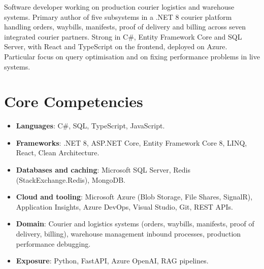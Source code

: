\documentclass[11pt,a4paper,sans]{moderncv}
\begin{document}
\makecvtitle


\vspace{6pt}
\small{Software developer working on production courier logistics and warehouse systems. Primary author of five subsystems in a .NET 8 courier platform handling orders, waybills, manifests, proof of delivery and billing across seven integrated courier partners. Strong in C\#, Entity Framework Core and SQL Server, with React and TypeScript on the frontend, deployed on Azure. Particular focus on query optimisation and on fixing performance problems in live systems.}


\section{Core Competencies}
\vspace{1pt}
\begin{itemize}

\item \textbf{Languages}: C\#, SQL, TypeScript, JavaScript.

\item \textbf{Frameworks}: .NET 8, ASP.NET Core, Entity Framework Core 8, LINQ, React, Clean Architecture.

\item \textbf{Databases and caching}: Microsoft SQL Server, Redis (StackExchange.Redis), MongoDB.

\item \textbf{Cloud and tooling}: Microsoft Azure (Blob Storage, File Shares, SignalR), Application Insights, Azure DevOps, Visual Studio, Git, REST APIs.

\item \textbf{Domain}: Courier and logistics systems (orders, waybills, manifests, proof of delivery, billing), warehouse management inbound processes, production performance debugging.

\item \textbf{Exposure}: Python, FastAPI, Azure OpenAI, RAG pipelines.

\end{itemize}

\end{document}
